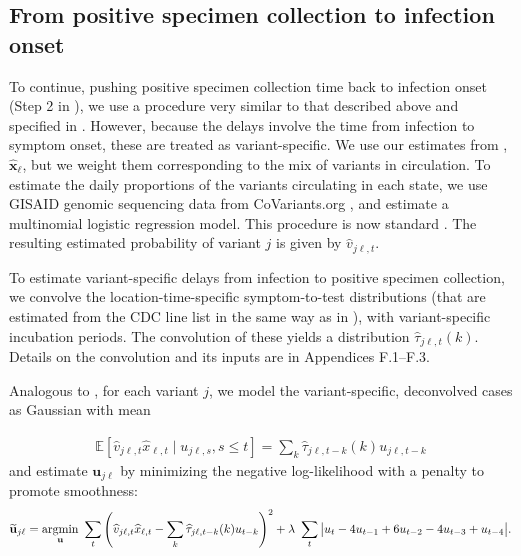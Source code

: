 \subsection{From positive specimen collection to infection onset}
\label{sec:step2-and-3}


To continue, pushing positive specimen collection time back to infection onset
(Step 2 in ), we use a procedure very
similar to that described above and specified in
. However, because the delays involve
the time from infection to symptom onset, these are treated as variant-specific.
We use our estimates from , $\widehat{\mathbf{x}}_\ell$, but we
weight them corresponding to the mix of variants in circulation. To estimate the
daily proportions of the variants circulating in each state, we use GISAID
genomic sequencing data from CoVariants.org \citep{hodcroft2021covariants,
elbe2017data}, and estimate a multinomial logistic regression model. This
procedure is now standard \citep[see Appendix~E for additional
details]{obermeyer2022analysis, annavajhala2021emergence, figgins2021sars}. The
resulting estimated probability of variant $j$ is given by $\hat{v}_{j\ell,t}$.

To estimate variant-specific delays from infection to positive specimen
collection, we convolve the location-time-specific symptom-to-test distributions
(that are estimated from the CDC line list in the same way as in
), with variant-specific incubation periods. The convolution of
these yields a distribution $\widehat{\tau}_{j\ell,t}(k)$. Details on the
convolution and its inputs are in Appendices F.1--F.3. 

\begin{linenomath*} 
Analogous to , for each variant $j$,
we model the variant-specific, deconvolved cases as Gaussian with mean
\end{linenomath*} 
\begin{linenomath*} 
\begin{align}
  \mathbb{E}\left[\widehat{v}_{j\ell,t}\widehat{x}_{\ell,t} \mid u_{j\ell,s}, s \leq t  \right] = \sum_k 
\widehat{\tau}_{j\ell,t-k}(k) u_{j\ell,t-k} 
\end{align}
and estimate $\mathbf{u}_{j\ell}$ by minimizing the negative log-likelihood with
a penalty to promote smoothness:
\begin{align}
\widetilde{\mathbf{u}}_{j\ell} = \operatorname*{argmin}_{\mathbf{u}}\ \sum_{t} 
\left( 
    \widehat{v}_{j\ell,t} \widehat{x}_{\ell,t} -  
    \sum_k \widehat{\tau}_{j\ell,t-k}(k) u_{t-k} 
\right)^2 
+ \lambda\ \sum_{t} \big|u_{t} - 4u_{t-1} + 6u_{t-2} -4u_{t-3}+ u_{t-4}\big|.
\end{align} 
\end{linenomath*} 


